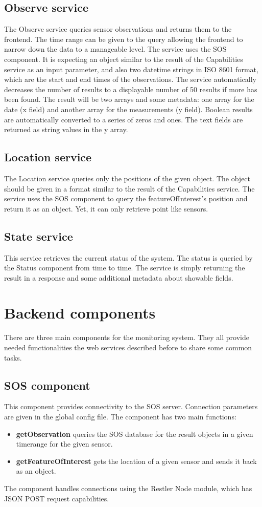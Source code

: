 \subsection{Observe service}
The Observe service queries sensor observations and returns them to the frontend.
The time range can be given to the query allowing the frontend to narrow down the data to a manageable level. The service uses the SOS component. It is expecting an object similar to the result of the Capabilities service as an input parameter, and also two datetime strings in ISO 8601 format, which are the start and end times of the observations. The service automatically decreases the number of results to a displayable number of 50 results if more has been found. The result will be two arrays and some metadata: one array for the date (x field) and another array for the measurements (y field). Boolean results are automatically converted to a series of zeros and ones. The text fields are returned as string values in the y array.

\subsection{Location service}
The Location service queries only the positions of the given object. The object should be given in a format similar to the result of the Capabilities service. The service uses the SOS component to query the featureOfInterest's position and return it as an object. Yet, it can only retrieve point like sensors.

\subsection{State service}
This service retrieves the current status of the system. The status is queried by the Status component from time to time. The service is simply returning the result in a response and some additional metadata about showable fields.

\section{Backend components}
There are three main components for the monitoring system. They all provide needed functionalities the web services described before to share some common tasks.

\subsection{SOS component}
This component provides connectivity to the SOS server. Connection parameters are given in the global config file. The component has two main functions:
\begin{itemize}
\item \textbf{getObservation} queries the SOS database for the result objects in a given timerange for the given sensor.
\item \textbf{getFeatureOfInterest} gets the location of a given sensor and sends it back as an object.
\end{itemize}
The component handles connections using the Restler Node module, which has JSON POST request capabilities.

